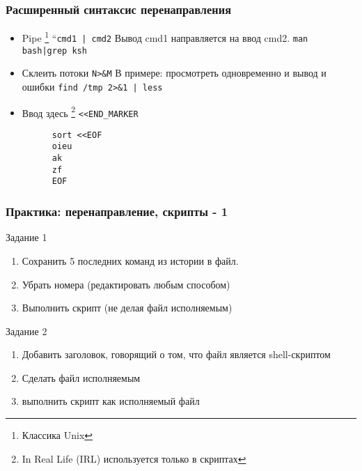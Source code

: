 \begin{frame}[fragile]
  \frametitle{Расширенный синтаксис перенаправления}
  
  \begin{itemize}
    \item \alert{Pipe} \footnote{Классика Unix} \textquotedbl``\verb+cmd1 | cmd2+ \textquotedbl \newline
      Вывод cmd1 направляется на ввод cmd2. \newline
      \verb+man bash|grep ksh+ \pause
    \item \alert{Склеить потоки} \textquotedbl \verb+N>&M+ \textquotedbl \newline
      В примере: просмотреть одновременно и вывод и ошибки \newline
      \verb+find /tmp 2>&1 | less+ \pause
    \item \alert{\textquotedbl Ввод здесь \textquotedbl}\footnote{In Real Life (IRL) используется только в скриптах} \textquotedbl \verb+<<END_MARKER+ \textquotedbl \newline
      \begin{verbatim}
      sort <<EOF
      oieu
      ak
      zf
      EOF
      \end{verbatim}
  \end{itemize}
\end{frame}

\begin{frame}
  \frametitle{Практика: перенаправление, скрипты - 1} 

  \alert{Задание 1}
  \begin{enumerate}
    \item Сохранить 5 последних команд из истории в файл.
    \item Убрать номера (редактировать любым способом)
    \item Выполнить скрипт (не делая файл исполняемым)
  \end{enumerate}
  \pause

  \alert{Задание 2}
  \begin{enumerate}
    \item Добавить заголовок, говорящий о том, что файл является shell-скриптом
    \item Сделать файл исполняемым
    \item выполнить скрипт как исполняемый файл
  \end{enumerate}
\end{frame}

